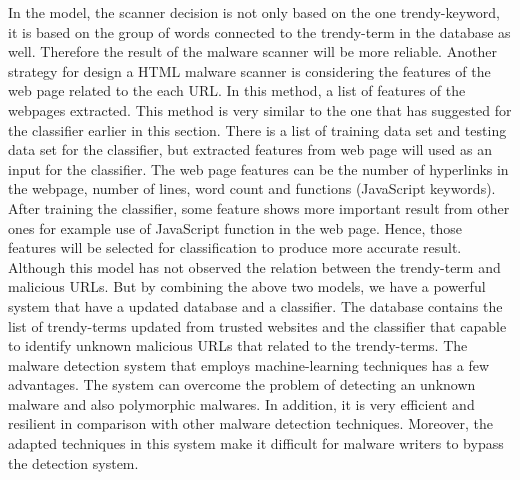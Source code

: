 In the model, the scanner decision is not only based on the one trendy-keyword, it is based on the group of words connected to the trendy-term in the database as well. Therefore the result of the malware scanner will be more reliable.
Another strategy for design a HTML malware scanner is considering the features of the web page related to the each URL. In this method, a list of features of the webpages extracted. This method is very similar to the one that has suggested for the classifier earlier in this section. There is a list of training data set and testing data set for the classifier, but extracted features from web page will used as an input for the classifier. The web page features can be the number of hyperlinks in the webpage, number of lines, word count and functions (JavaScript keywords).
After training the classifier, some feature shows more important result from other ones for example use of JavaScript function in the web page. Hence, those features will be selected for classification to produce more accurate result. Although this model has not observed the relation between the trendy-term and malicious URLs. But by combining the above two models, we have a powerful system that have a updated database and a classifier. The database contains the list of trendy-terms updated from trusted websites and the classifier that capable to identify unknown malicious URLs that related to the trendy-terms.
The malware detection system that employs machine-learning techniques has a few advantages. The system can overcome the problem of detecting an unknown malware and also polymorphic malwares. In addition, it is very efficient and resilient in comparison with other malware detection techniques. Moreover, the adapted techniques in this system make it difficult for malware writers to bypass the detection system. 
